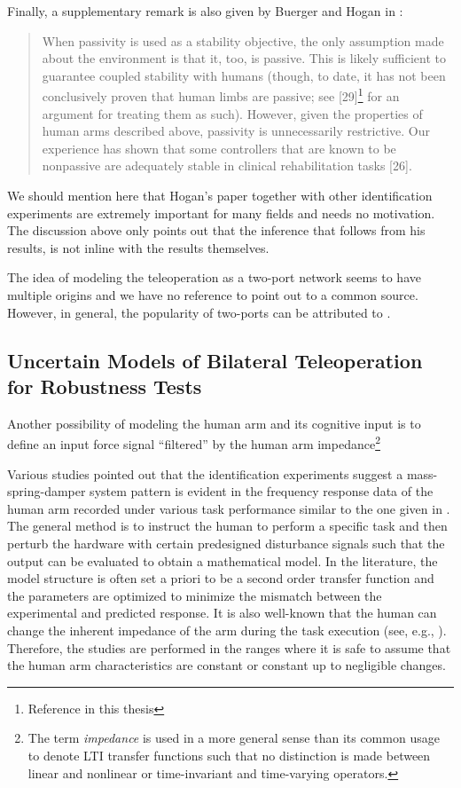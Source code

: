 \noindent Finally, a supplementary remark is also given by Buerger and Hogan in \cite{buergerhogan1}: 
\begin{quote}
When passivity is used as a stability objective, the only assumption
made about the environment is that it, too, is passive.
This is likely sufficient to guarantee coupled stability with humans
(though, to date, it has not been conclusively proven that
human limbs are passive; see [29]\footnote{Reference \cite{hogan89} in this thesis} for an argument for treating
them as such). However, given the properties of human arms
described above, passivity is unnecessarily restrictive. Our experience
has shown that some controllers that are known to be
nonpassive are adequately stable in clinical rehabilitation tasks [26].
\end{quote}


We should mention here that Hogan's paper together with other identification experiments are extremely important for many
fields and needs no motivation. The discussion above only points out that the inference that follows from his results, 
is not inline with the results themselves. 

The idea of modeling the teleoperation as a two-port network seems to have multiple origins and we have no reference to 
point out to a common source. However, in general, the popularity of two-ports can be attributed to 
\cite{andersonspong,nieslotine,rajuphd,hannaford89,yokokohjiyoshikawa}. 

\subsection{Uncertain Models of Bilateral Teleoperation for Robustness Tests}\label{sec:lit:uncmodel}

Another possibility of modeling the human arm and its cognitive input is to define an input force signal ``filtered'' by the 
human arm impedance\footnote{The term \emph{impedance} is used in a more general sense than its common usage to denote
LTI transfer functions such that no distinction is made between linear and nonlinear or time-invariant and time-varying 
operators.} 

Various studies pointed out that the identification experiments suggest a mass-spring-damper system pattern is evident
in the frequency response data of the human arm recorded under various task performance similar to the one given in \cite{hogan89}.
The general method is to instruct the human to perform a specific task and then perturb the hardware with certain predesigned
disturbance signals such that the output can be evaluated to obtain a mathematical model. In the literature, the model structure
is often set a priori to be a second order transfer function and the parameters are optimized to minimize the mismatch between
the experimental and predicted response. It is also well-known that the human can change the inherent impedance of the arm during
the task execution (see, e.g., \cite{tsujimorasso}). Therefore, the studies are performed in the ranges where it is safe to assume 
that the human arm characteristics are constant or constant up to negligible changes. 


